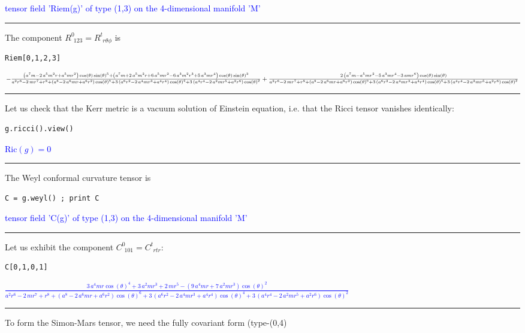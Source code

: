 \documentclass[a4paper]{jpconf}
\newcommand{\soutput}[1]{\textcolor{blue}{#1}\\[-0.8ex]\rule{\textwidth}{0.4pt}}
\begin{document}
\soutput{tensor field 'Riem(g)' of type (1,3) on the 4-dimensional manifold 'M'}
The component $R^0_{\ \, 123} = R^t_{\ \, r\theta\phi}$ is 
\begin{verbatim}
Riem[0,1,2,3]
\end{verbatim}
\soutput{$-\frac{{\left(a^{7} m - 2 \, a^{5} m^{2} r + a^{5} m r^{2}\right)}
\cos\left(\theta\right) \sin\left(\theta\right)^{5} + {\left(a^{7} m + 2
\, a^{5} m^{2} r + 6 \, a^{5} m r^{2} - 6 \, a^{3} m^{2} r^{3} + 5 \,
a^{3} m r^{4}\right)} \cos\left(\theta\right)
\sin\left(\theta\right)^{3}}{a^{2} r^{6} - 2 \, m r^{7} + r^{8} +
{\left(a^{8} - 2 \, a^{6} m r + a^{6} r^{2}\right)}
\cos\left(\theta\right)^{6} + 3 \, {\left(a^{6} r^{2} - 2 \, a^{4} m
r^{3} + a^{4} r^{4}\right)} \cos\left(\theta\right)^{4} + 3 \,
{\left(a^{4} r^{4} - 2 \, a^{2} m r^{5} + a^{2} r^{6}\right)}
\cos\left(\theta\right)^{2}}\\
+ \frac{2 \, {\left(a^{7} m - a^{5} m r^{2} - 5 \,
a^{3} m r^{4} - 3 \, a m r^{6}\right)} \cos\left(\theta\right)
\sin\left(\theta\right)}{a^{2} r^{6} - 2 \, m r^{7} + r^{8} +
{\left(a^{8} - 2 \, a^{6} m r + a^{6} r^{2}\right)}
\cos\left(\theta\right)^{6} + 3 \, {\left(a^{6} r^{2} - 2 \, a^{4} m
r^{3} + a^{4} r^{4}\right)} \cos\left(\theta\right)^{4} + 3 \,
{\left(a^{4} r^{4} - 2 \, a^{2} m r^{5} + a^{2} r^{6}\right)}
\cos\left(\theta\right)^{2}}$}
Let us check that the Kerr metric is 
a vacuum solution of Einstein equation, i.e. that the Ricci tensor
vanishes identically:
\begin{verbatim}
g.ricci().view()
\end{verbatim}
\soutput{$\mathrm{Ric}(g) = 0$}
The Weyl conformal curvature tensor is
\begin{verbatim}
C = g.weyl() ; print C
\end{verbatim}
\soutput{tensor field 'C(g)' of type (1,3) on the 4-dimensional manifold 'M'}
Let us exhibit the component $C^0_{\ \, 101}=C^t_{\ \, rtr}$:
\begin{verbatim}
C[0,1,0,1]
\end{verbatim}
\soutput{$\frac{3 \, a^{4} m r \cos\left(\theta\right)^{4} + 3 \, a^{2} m r^{3} +
2 \, m r^{5} - {\left(9 \, a^{4} m r + 7 \, a^{2} m r^{3}\right)}
\cos\left(\theta\right)^{2}}{a^{2} r^{6} - 2 \, m r^{7} + r^{8} +
{\left(a^{8} - 2 \, a^{6} m r + a^{6} r^{2}\right)}
\cos\left(\theta\right)^{6} + 3 \, {\left(a^{6} r^{2} - 2 \, a^{4} m
r^{3} + a^{4} r^{4}\right)} \cos\left(\theta\right)^{4} + 3 \,
{\left(a^{4} r^{4} - 2 \, a^{2} m r^{5} + a^{2} r^{6}\right)}
\cos\left(\theta\right)^{2}}$}
To form the Simon-Mars tensor, we need the fully covariant form (type-(0,4)
\end{document}
